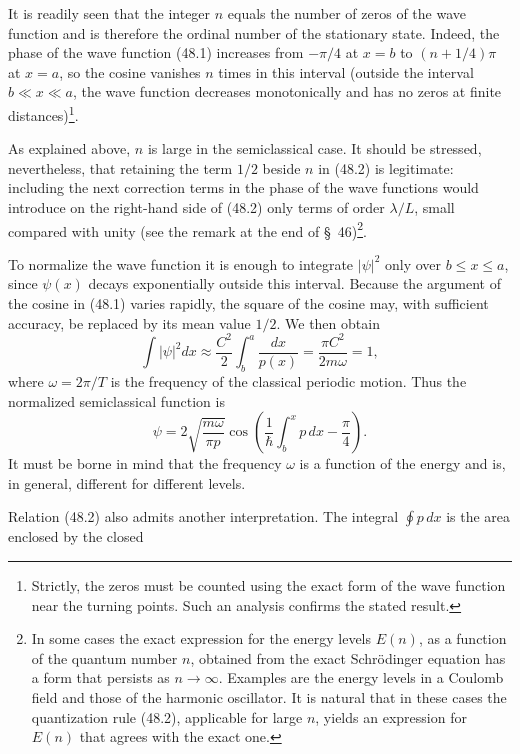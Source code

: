 It is readily seen that the integer $n$ equals the number of zeros of the wave
function and is therefore the ordinal number of the stationary state. Indeed,
the phase of the wave function (48.1) increases from $-\pi/4$ at $x=b$ to
$(n+1/4)\pi$ at $x=a$, so the cosine vanishes $n$ times in this interval
(outside the interval $b\ll x\ll a$, the wave function decreases monotonically
and has no zeros at finite distances)\footnote{Strictly, the zeros must be
counted using the exact form of the wave function near the turning points.
Such an analysis confirms the stated result.}.

As explained above, $n$ is large in the semiclassical case. It should be
stressed, nevertheless, that retaining the term $1/2$ beside $n$ in (48.2) is
legitimate: including the next correction terms in the phase of the wave
functions would introduce on the right-hand side of (48.2) only terms of order
$\lambda/L$, small compared with unity (see the remark at the end of
§~46)\footnote{In some cases the exact expression for the energy levels
$E(n)$, as a function of the quantum number $n$, obtained from the exact
Schrödinger equation has a form that persists as $n\to\infty$. Examples are
the energy levels in a Coulomb field and those of the harmonic oscillator. It
is natural that in these cases the quantization rule (48.2), applicable for
large $n$, yields an expression for $E(n)$ that agrees with the exact one.}.

To normalize the wave function it is enough to integrate $|\psi|^2$ only over
$b\leq x\leq a$, since $\psi(x)$ decays exponentially outside this interval.
Because the argument of the cosine in (48.1) varies rapidly, the square of the
cosine may, with sufficient accuracy, be replaced by its mean value $1/2$.
We then obtain
\[
  \int|\psi|^2dx\approx\frac{C^2}{2}\int_b^a\frac{dx}{p(x)}
  =\frac{\pi C^2}{2m\omega}=1,
\]
where $\omega=2\pi/T$ is the frequency of the classical periodic motion. Thus
the normalized semiclassical function is
\begin{equation}
  \psi=2\sqrt{\frac{m\omega}{\pi p}}
  \cos\left(\frac1\hbar\int_b^x p\,dx-\frac\pi4\right).
  \tag{48.3}
\end{equation}
It must be borne in mind that the frequency $\omega$ is a function of the
energy and is, in general, different for different levels.

Relation (48.2) also admits another interpretation. The integral
$\oint p\,dx$ is the area enclosed by the closed

